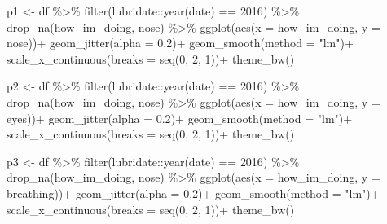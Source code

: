 \documentclass[
]{article}
\newenvironment{Shaded}{\begin{snugshade}}{\end{snugshade}}
\newcommand{\AttributeTok}[1]{\textcolor[rgb]{0.77,0.63,0.00}{#1}}
\newcommand{\DecValTok}[1]{\textcolor[rgb]{0.00,0.00,0.81}{#1}}
\newcommand{\FloatTok}[1]{\textcolor[rgb]{0.00,0.00,0.81}{#1}}
\newcommand{\FunctionTok}[1]{\textcolor[rgb]{0.00,0.00,0.00}{#1}}
\newcommand{\NormalTok}[1]{#1}
\newcommand{\OtherTok}[1]{\textcolor[rgb]{0.56,0.35,0.01}{#1}}
\newcommand{\SpecialCharTok}[1]{\textcolor[rgb]{0.00,0.00,0.00}{#1}}
\newcommand{\StringTok}[1]{\textcolor[rgb]{0.31,0.60,0.02}{#1}}
\begin{document}
\begin{Shaded}
\begin{Highlighting}[]
\NormalTok{p1 }\OtherTok{\textless{}{-}}\NormalTok{ df }\SpecialCharTok{\%\textgreater{}\%}
  \FunctionTok{filter}\NormalTok{(lubridate}\SpecialCharTok{::}\FunctionTok{year}\NormalTok{(date) }\SpecialCharTok{==} \DecValTok{2016}\NormalTok{) }\SpecialCharTok{\%\textgreater{}\%}
  \FunctionTok{drop\_na}\NormalTok{(how\_im\_doing,}
\NormalTok{          nose) }\SpecialCharTok{\%\textgreater{}\%}
  \FunctionTok{ggplot}\NormalTok{(}\FunctionTok{aes}\NormalTok{(}\AttributeTok{x =}\NormalTok{ how\_im\_doing, }\AttributeTok{y =}\NormalTok{ nose))}\SpecialCharTok{+}
  \FunctionTok{geom\_jitter}\NormalTok{(}\AttributeTok{alpha =} \FloatTok{0.2}\NormalTok{)}\SpecialCharTok{+}
  \FunctionTok{geom\_smooth}\NormalTok{(}\AttributeTok{method =} \StringTok{"lm"}\NormalTok{)}\SpecialCharTok{+}
  \FunctionTok{scale\_x\_continuous}\NormalTok{(}\AttributeTok{breaks =} \FunctionTok{seq}\NormalTok{(}\DecValTok{0}\NormalTok{, }\DecValTok{2}\NormalTok{, }\DecValTok{1}\NormalTok{))}\SpecialCharTok{+}
  \FunctionTok{theme\_bw}\NormalTok{()}
  
\NormalTok{p2 }\OtherTok{\textless{}{-}}\NormalTok{ df }\SpecialCharTok{\%\textgreater{}\%}
  \FunctionTok{filter}\NormalTok{(lubridate}\SpecialCharTok{::}\FunctionTok{year}\NormalTok{(date) }\SpecialCharTok{==} \DecValTok{2016}\NormalTok{) }\SpecialCharTok{\%\textgreater{}\%}
  \FunctionTok{drop\_na}\NormalTok{(how\_im\_doing,}
\NormalTok{          nose) }\SpecialCharTok{\%\textgreater{}\%}
  \FunctionTok{ggplot}\NormalTok{(}\FunctionTok{aes}\NormalTok{(}\AttributeTok{x =}\NormalTok{ how\_im\_doing, }\AttributeTok{y =}\NormalTok{ eyes))}\SpecialCharTok{+}
  \FunctionTok{geom\_jitter}\NormalTok{(}\AttributeTok{alpha =} \FloatTok{0.2}\NormalTok{)}\SpecialCharTok{+}
  \FunctionTok{geom\_smooth}\NormalTok{(}\AttributeTok{method =} \StringTok{"lm"}\NormalTok{)}\SpecialCharTok{+}
  \FunctionTok{scale\_x\_continuous}\NormalTok{(}\AttributeTok{breaks =} \FunctionTok{seq}\NormalTok{(}\DecValTok{0}\NormalTok{, }\DecValTok{2}\NormalTok{, }\DecValTok{1}\NormalTok{))}\SpecialCharTok{+}
  \FunctionTok{theme\_bw}\NormalTok{() }
  
\NormalTok{p3 }\OtherTok{\textless{}{-}}\NormalTok{ df }\SpecialCharTok{\%\textgreater{}\%}
  \FunctionTok{filter}\NormalTok{(lubridate}\SpecialCharTok{::}\FunctionTok{year}\NormalTok{(date) }\SpecialCharTok{==} \DecValTok{2016}\NormalTok{) }\SpecialCharTok{\%\textgreater{}\%}
  \FunctionTok{drop\_na}\NormalTok{(how\_im\_doing,}
\NormalTok{          nose) }\SpecialCharTok{\%\textgreater{}\%}
  \FunctionTok{ggplot}\NormalTok{(}\FunctionTok{aes}\NormalTok{(}\AttributeTok{x =}\NormalTok{ how\_im\_doing, }\AttributeTok{y =}\NormalTok{ breathing))}\SpecialCharTok{+}
  \FunctionTok{geom\_jitter}\NormalTok{(}\AttributeTok{alpha =} \FloatTok{0.2}\NormalTok{)}\SpecialCharTok{+}
  \FunctionTok{geom\_smooth}\NormalTok{(}\AttributeTok{method =} \StringTok{"lm"}\NormalTok{)}\SpecialCharTok{+}
  \FunctionTok{scale\_x\_continuous}\NormalTok{(}\AttributeTok{breaks =} \FunctionTok{seq}\NormalTok{(}\DecValTok{0}\NormalTok{, }\DecValTok{2}\NormalTok{, }\DecValTok{1}\NormalTok{))}\SpecialCharTok{+}
  \FunctionTok{theme\_bw}\NormalTok{()}


\end{Highlighting}
\end{Shaded}
\end{document}
